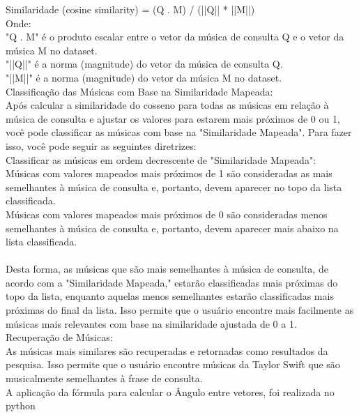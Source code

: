 \documentclass[a4paper,12pt]{article}
\begin{document}
Similaridade (cosine similarity) = (Q . M) / (||Q|| * ||M||)\\

Onde:\\
"Q . M" é o produto escalar entre o vetor da música de consulta Q e o vetor da música M no dataset.\\
"||Q||" é a norma (magnitude) do vetor da música de consulta Q.\\
"||M||" é a norma (magnitude) do vetor da música M no dataset.\\

Classificação das Músicas com Base na Similaridade Mapeada:\\
Após calcular a similaridade do cosseno para todas as músicas em relação à música de consulta e ajustar os valores para estarem mais próximos de 0 ou 1, você pode classificar as músicas com base na "Similaridade Mapeada". Para fazer isso, você pode seguir as seguintes diretrizes:\\

Classificar as músicas em ordem decrescente de "Similaridade Mapeada":\\
Músicas com valores mapeados mais próximos de 1 são consideradas as mais semelhantes à música de consulta e, portanto, devem aparecer no topo da lista classificada.\\
Músicas com valores mapeados mais próximos de 0 são consideradas menos semelhantes à música de consulta e, portanto, devem aparecer mais abaixo na lista classificada.\\\\
Desta forma, as músicas que são mais semelhantes à música de consulta, de acordo com a "Similaridade Mapeada," estarão classificadas mais próximas do topo da lista, enquanto aquelas menos semelhantes estarão classificadas mais próximas do final da lista. Isso permite que o usuário encontre mais facilmente as músicas mais relevantes com base na similaridade ajustada de 0 a 1.\\

Recuperação de Músicas:\\
As músicas mais similares são recuperadas e retornadas como resultados da pesquisa. Isso permite que o usuário encontre músicas da Taylor Swift que são musicalmente semelhantes à frase de consulta.\\


A aplicação da fórmula para calcular o Ângulo entre vetores, foi realizada no python\\
\end{document}
